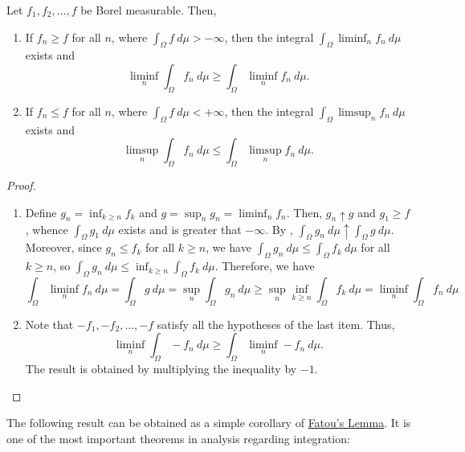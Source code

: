 \begin{thrm}\label{theorem:Fatou's Lemma} Let
\(f_1,f_2,\dots,f\) be Borel measurable. Then,
	\begin{enumerate}
		\item If \(f_n\geq f\) for all \(n\), where
\(\int_{\Omega}f~d\mu>-\infty\), then the integral
\(\int_{\Omega}\liminf_nf_n~d\mu\) exists and
		\[\liminf_n\int_{\Omega}f_n~d\mu\geq\int_{\Omega}\liminf_nf_n~d\mu.\]
		\item If \(f_n\leq f\) for all \(n\), where
\(\int_{\Omega}f~d\mu<+\infty\), then the integral
\(\int_{\Omega}\limsup_nf_n~d\mu\) exists and
		\[\limsup_n\int_{\Omega}f_n~d\mu\leq\int_{\Omega}\limsup_nf_n~d\mu.\]
	\end{enumerate}
\end{thrm}

\begin{proof}
	\begin{enumerate}
		\item Define \(g_n=\inf_{k\geq n}f_k\) and
\(g=\sup_n g_n=\liminf_nf_n\). Then, \(g_n\uparrow g\) and \(g_1\geq f\), whence
\(\int_{\Omega}g_1~d\mu\) exists and is greater that \(-\infty\). By
,
\(\int_{\Omega}g_n~d\mu\uparrow\int_{\Omega}g~d\mu\). Moreover, since
\(g_n\leq f_k\) for all \(k\geq n\), we have
\(\int_{\Omega}g_n~d\mu\leq\int_{\Omega}f_k~d\mu\) for all \(k\geq n\), so
\(\int_{\Omega}g_n~d\mu\leq\inf_{k\geq n}\int_{\Omega}f_k~d\mu\). Therefore, we
have
		\[\int_{\Omega}\liminf_nf_n~d\mu=\int_{\Omega}g~d\mu=\sup_n\int_{\Omega}g_n~d\mu\geq\sup_n\inf_{k\geq n}\int_{\Omega}f_k~d\mu=\liminf_n\int_{\Omega}f_n~d\mu\]
		\item Note that \(-f_1,-f_2,\dots,-f\) satisfy all the hypotheses of the
last item. Thus,
		\[\liminf_n\int_{\Omega}-f_n~d\mu\geq\int_{\Omega}\liminf_n-f_n~d\mu.\]
The result is obtained by multiplying the inequality by \(-1\).
	\end{enumerate}
\end{proof}
The following result can be obtained as a simple corollary
of \hyperref[theorem:Fatou's Lemma]{Fatou's Lemma}. It is one of the most important
theorems in analysis regarding integration:

